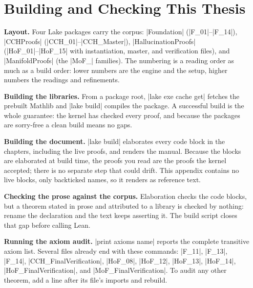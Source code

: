 \documentclass{memoir}
\begin{document}
\section{Building and Checking This Thesis}\label{Two--Schemas--of--Impossibility-005F-005F-005F--Machine--Checked--Limits--of--Trustworthy--Machine--Learning-005F-005F-005F--and--Why--They--Tighten--with--Capability----Appendices----Building--and--Checking--This--Thesis}

\textbf{Layout.} Four Lake packages carry the corpus: \LeanVerb|Foundation| (\LeanVerb|F_01|–\LeanVerb|F_14|),
\LeanVerb|CCHProofs| (\LeanVerb|CCH_01|–\LeanVerb|CCH_Master|), \LeanVerb|HallucinationProofs| (\LeanVerb|HoF_01|–\LeanVerb|HoF_15| with
instantiation, master, and verification files), and \LeanVerb|ManifoldProofs| (the \LeanVerb|MoF_|
families). The numbering is a reading order as much as a build order: lower numbers
are the engine and the setup, higher numbers the readings and refinements.

\textbf{Building the libraries.} From a package root, \LeanVerb|lake exe cache get| fetches the
prebuilt Mathlib and \LeanVerb|lake build| compiles the package. A successful build is the
whole guarantee: the kernel has checked every proof, and because the packages are
sorry-free a clean build means no gaps.

\textbf{Building the document.} \LeanVerb|lake build| elaborates every code block in the chapters,
including the live proofs, and renders the manual. Because the blocks are elaborated
at build time, the proofs you read are the proofs the kernel accepted; there is no
separate step that could drift. This appendix contains no live blocks, only
backticked names, so it renders as reference text.

\textbf{Checking the prose against the corpus.} Elaboration checks the code blocks, but a
theorem stated in prose and attributed to a library is checked by nothing: rename
the declaration and the text keeps asserting it. The build script closes that gap
before calling Lean.

\textbf{Running the axiom audit.} \LeanVerb|print axioms name| reports the complete transitive axiom
list. Several files already end with these commands: \LeanVerb|F_11|, \LeanVerb|F_13|, \LeanVerb|F_14|,
\LeanVerb|CCH_FinalVerification|, \LeanVerb|HoF_08|, \LeanVerb|HoF_12|, \LeanVerb|HoF_13|, \LeanVerb|HoF_14|,
\LeanVerb|HoF_FinalVerification|, and \LeanVerb|MoF_FinalVerification|. To audit any other theorem,
add a line after its file's imports and rebuild.
\end{document}
